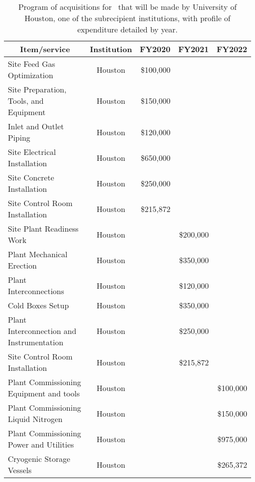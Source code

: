 \begin{table}[]
\begin{center}
\begin{tabular}{l|c|r|r|r} 
\hline
\hline
\multicolumn{1}{c|}{\textbf{Item/service}}
											&\multicolumn{1}{c|}{\textbf{Institution}}
														&\multicolumn{1}{c|}{\bf FY2020}
																	&\multicolumn{1}{c|}{\bf FY2021}
																				&\multicolumn{1}{c}{\bf FY2022} \\
\hline
Site Feed Gas Optimization					&Houston	&\$100,000	&			&\\
Site Preparation, Tools, and Equipment		&Houston	&\$150,000	&			&\\
Inlet and Outlet Piping						&Houston	&\$120,000	&			&\\
Site Electrical Installation				&Houston	&\$650,000	&			&\\
Site Concrete Installation					&Houston	&\$250,000	&			&\\
Site Control Room Installation				&Houston	&\$215,872	&			&\\
Site Plant Readiness Work					&Houston	&			&\$200,000	&\\
Plant Mechanical Erection					&Houston	&			&\$350,000	&\\
Plant Interconnections						&Houston	&			&\$120,000	&\\
Cold Boxes Setup							&Houston	&			&\$350,000	&\\
Plant Interconnection and Instrumentation	&Houston	&			&\$250,000	&\\
Site Control Room Installation				&Houston	&			&\$215,872	&\\
Plant Commissioning Equipment and tools		&Houston	&			&			&\$100,000\\
Plant Commissioning Liquid Nitrogen			&Houston	&			&			&\$150,000\\
Plant Commissioning Power and Utilities		&Houston	&			&			&\$975,000\\
Cryogenic Storage Vessels					&Houston	&			&			&\$265,372\\
\hline
\end{tabular}
\caption[\Urania\ acquisitions program]{Program of acquisitions for \Urania\ that will be made by University of Houston, one of the subrecipient institutions, with profile of expenditure detailed by year.}
\label{tab:AcquisitionsUrania}
\end{center}
\end{table}